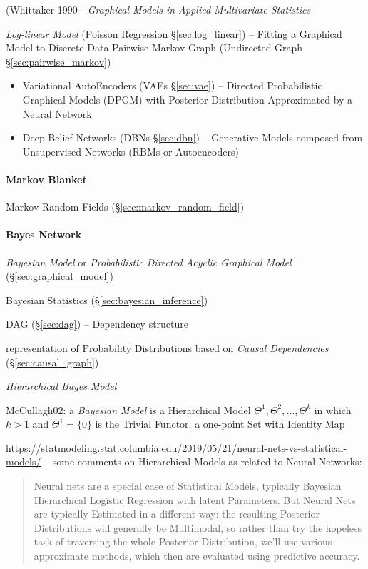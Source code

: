 (Whittaker 1990 - \emph{Graphical Models in Applied Multivariate Statistics}

\fist \emph{Log-linear Model} (Poisson Regression \S\ref{sec:log_linear}) --
Fitting a Graphical Model to Discrete Data \fist Pairwise Markov Graph
(Undirected Graph \S\ref{sec:pairwise_markov})

\begin{itemize}
  \item Variational AutoEncoders (VAEs \S\ref{sec:vae}) -- Directed
    Probabilistic Graphical Models (DPGM) with Posterior Distribution
    Approximated by a Neural Network
  \item Deep Belief Networks (DBNs \S\ref{sec:dbn}) -- Generative Models
    composed from Unsupervised Networks (RBMs or Autoencoders)
\end{itemize}



\paragraph{Markov Blanket}\label{sec:markov_blanket}\hfill

Markov Random Fields (\S\ref{sec:markov_random_field})



\paragraph{Bayes Network}\label{sec:bayes_network}\hfill

\emph{Bayesian Model} or \emph{Probabilistic Directed Acyclic Graphical Model}
(\S\ref{sec:graphical_model})

Bayesian Statistics (\S\ref{sec:bayesian_inference})

DAG (\S\ref{sec:dag}) -- Dependency structure

representation of Probability Distributions based on \emph{Causal Dependencies}
(\S\ref{sec:causal_graph})

\emph{Hierarchical Bayes Model}

McCullagh02: a \emph{Bayesian Model} is a Hierarchical Model
$\Theta^1, \Theta^2, \ldots, \Theta^k$ in which $k > 1$ and $\Theta^1 = \{0\}$
is the Trivial Functor, a one-point Set with Identity Map

\url{https://statmodeling.stat.columbia.edu/2019/05/21/neural-nets-vs-statistical-models/}
-- some comments on Hierarchical Models as related to Neural Networks:
\begin{quote}
  Neural nets are a special case of Statistical Models, typically Bayesian
  Hierarchical Logistic Regression with latent Parameters. But Neural Nets are
  typically Estimated in a different way: the resulting Posterior Distributions
  will generally be Multimodal, so rather than try the hopeless task of
  traversing the whole Posterior Distribution, we’ll use various approximate
  methods, which then are evaluated using predictive accuracy.
\end{quote}

